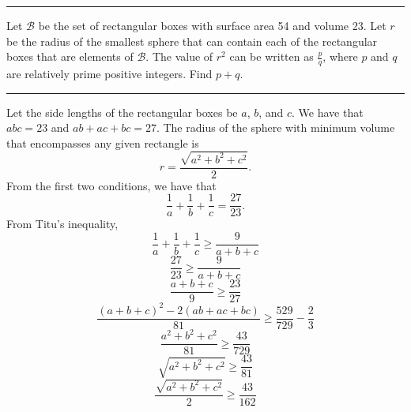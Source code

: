 \documentclass[11pt]{scrartcl}
\begin{document}
\rule{\textwidth}{0.4pt}

\pagebreak

\begin{problem}
    Let $\mathcal{B}$ be the set of rectangular boxes with surface area 54 and volume 23. Let $r$ be the radius of the smallest sphere that can contain each of the rectangular boxes that are elements of $\mathcal{B}$. The value of $r^{2}$ can be written as $\frac{p}{q}$, where $p$ and $q$ are relatively prime positive integers. Find $p + q$.
\end{problem}

\rule{\textwidth}{0.4pt}

Let the side lengths of the rectangular boxes be $a$, $b$, and $c$. We have that $abc = 23$ and $ab + ac + bc = 27$. The radius of the sphere with minimum volume that encompasses any given rectangle is
\[r = \frac{\sqrt{a^{2} + b^{2} + c^{2}}}{2}.\]
From the first two conditions, we have that
\[\frac{1}{a} + \frac{1}{b} + \frac{1}{c} = \frac{27}{23}.\]
From Titu's inequality,
\[\frac{1}{a} + \frac{1}{b} + \frac{1}{c} \geq \frac{9}{a + b + c}\]
\[\frac{27}{23} \geq \frac{9}{a + b + c}\]
\[\frac{a + b + c}{9} \geq \frac{23}{27}\]
\[\frac{(a + b + c)^{2} - 2(ab + ac + bc)}{81} \geq \frac{529}{729} - \frac{2}{3}\]
\[\frac{a^{2} + b^{2} + c^{2}}{81} \geq \frac{43}{729}\]
\[\sqrt{a^{2} + b^{2} + c^{2}} \geq \frac{43}{81}\]
\[\frac{\sqrt{a^{2} + b^{2} + c^{2}}}{2} \geq \frac{43}{162}\]
\end{document}
